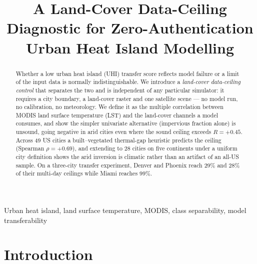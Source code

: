 \documentclass[conference]{IEEEtran}
\title{A Land-Cover Data-Ceiling Diagnostic for Zero-Authentication
Urban Heat Island Modelling}
\author{
\IEEEauthorblockN{Abhiram Donepudi}
\IEEEauthorblockA{Westwood High School, Round Rock, TX\\
\texttt{abhiram.donepudi@gmail.com}}
}
\begin{document}
\maketitle

\begin{abstract}
Whether a low urban heat island (UHI) transfer score reflects model
failure or a limit of the input data is normally indistinguishable. We
introduce a \emph{land-cover data-ceiling control} that separates the two
and is independent of any particular simulator: it requires a city
boundary, a land-cover raster and one satellite scene --- no model run, no
calibration, no meteorology. We define it as the multiple correlation
between MODIS land surface temperature (LST) and the land-cover channels a
model consumes, and show the simpler univariate alternative (impervious
fraction alone) is unsound, going negative in arid cities even where the
sound ceiling exceeds $R{=}{+}0.45$. Across 49 US cities a
built--vegetated thermal-gap heuristic predicts the ceiling (Spearman
$\rho{=}{+}0.69$), and extending to 28 cities on five continents under a
uniform city definition shows the arid inversion is climatic rather than
an artifact of an all-US sample. On a three-city transfer experiment,
Denver and Phoenix reach 29\% and 28\% of their multi-day ceilings while
Miami reaches 99\%.
\end{abstract}

\begin{IEEEkeywords}
Urban heat island, land surface temperature, MODIS, class separability,
model transferability
\end{IEEEkeywords}

\section{Introduction}
\end{document}
